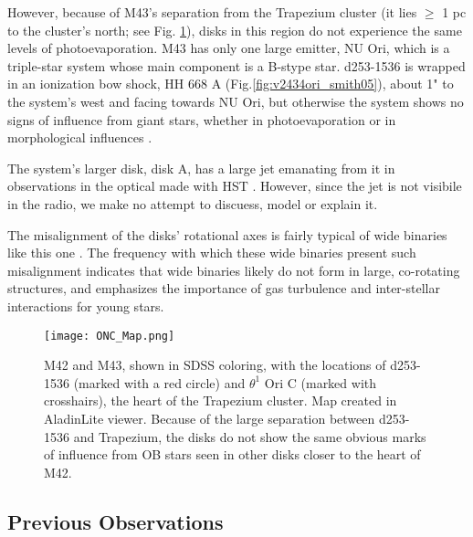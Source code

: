 However, because of M43's separation from the Trapezium cluster (it lies $\geq$ 1 pc to the cluster's north; see Fig. \ref{fig:onc_map}), disks in this region do not experience the same levels of photoevaporation. M43 has only one large emitter, NU Ori, which is a triple-star system whose main component is a B-stype star. d253-1536 is wrapped in an ionization bow shock, HH 668 A (Fig.\ref{fig:v2434ori_smith05}), about 1" to the system's west and facing towards NU Ori, but otherwise the system shows no signs of influence from giant stars, whether in photoevaporation or in morphological influences \citep{MannWilliams2009}.

The system's larger disk, disk A, has a large jet emanating from it in observations in the optical made with HST \citep{Smith2005}. However, since the jet is not visibile in the radio, we make no attempt to discuess, model or explain it.

The misalignment of the disks' rotational axes is fairly typical of wide binaries like this one \citep{Williams2014}. The frequency with which these wide binaries present such misalignment indicates that wide binaries likely do not form in large, co-rotating structures, and emphasizes the importance of gas turbulence and inter-stellar interactions for young stars.

\begin{figure}[t]
\centering
  \texttt{[image: ONC\_Map.png]}
  \caption{M42 and M43, shown in SDSS coloring, with the locations of d253-1536 (marked with a red circle) and $\theta^1$ Ori C (marked with crosshairs), the heart of the Trapezium cluster. Map created in AladinLite viewer. Because of the large separation between d253-1536 and Trapezium, the disks do not show the same obvious marks of influence from OB stars seen in other disks closer to the heart of M42.}
  \label{fig:onc_map}
\end{figure}
%




\subsection{Previous Observations}

